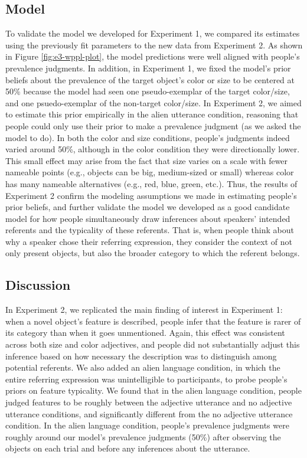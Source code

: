 \documentclass{ucetd}
\begin{document}
\hypertarget{model-1}{%
\subsection{Model}\label{model-1}}

To validate the model we developed for Experiment 1, we compared its
estimates using the previously fit parameters to the new data from
Experiment 2. As shown in Figure \ref{fig:e3-wppl-plot}, the model
predictions were well aligned with people's prevalence judgments. In
addition, in Experiment 1, we fixed the model's prior beliefs about the
prevalence of the target object's color or size to be centered at 50\%
because the model had seen one pseudo-exemplar of the target color/size,
and one psuedo-exemplar of the non-target color/size. In Experiment 2,
we aimed to estimate this prior empirically in the alien utterance
condition, reasoning that people could only use their prior to make a
prevalence judgment (as we asked the model to do). In both the color and
size conditions, people's judgments indeed varied around 50\%, although
in the color condition they were directionally lower. This small effect
may arise from the fact that size varies on a scale with fewer nameable
points (e.g., objects can be big, medium-sized or small) whereas color
has many nameable alternatives (e.g., red, blue, green, etc.). Thus, the
results of Experiment 2 confirm the modeling assumptions we made in
estimating people's prior beliefs, and further validate the model we
developed as a good candidate model for how people simultaneously draw
inferences about speakers' intended referents and the typicality of
these referents. That is, when people think about why a speaker chose
their referring expression, they consider the context of not only
present objects, but also the broader category to which the referent
belongs.

\hypertarget{discussion-2}{%
\subsection{Discussion}\label{discussion-2}}

In Experiment 2, we replicated the main finding of interest in
Experiment 1: when a novel object's feature is described, people infer
that the feature is rarer of its category than when it goes unmentioned.
Again, this effect was consistent across both size and color adjectives,
and people did not substantially adjust this inference based on how
necessary the description was to distinguish among potential referents.
We also added an alien language condition, in which the entire referring
expression was unintelligible to participants, to probe people's priors
on feature typicality. We found that in the alien language condition,
people judged features to be roughly between the adjective utterance and
no adjective utterance conditions, and significantly different from the
no adjective utterance condition. In the alien language condition,
people's prevalence judgments were roughly around our model's prevalence
judgments (50\%) after observing the objects on each trial and before
any inferences about the utterance.
\end{document}
